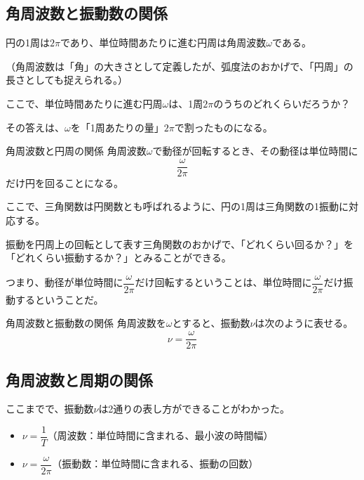 \documentclass[../math-imaging]{subfiles}
\begin{document}
\subsection{角周波数と振動数の関係}

円の1周は$2\pi$であり、単位時間あたりに進む円周は角周波数$\omega$である。

\footnotesize
（角周波数は「角」の大きさとして定義したが、弧度法のおかげで、「円周」の長さとしても捉えられる。）
\normalsize

ここで、単位時間あたりに進む円周$\omega$は、1周$2\pi$のうちのどれくらいだろうか？

その答えは、$\omega$を「1周あたりの量」$2\pi$で割ったものになる。

\begin{theorem}{角周波数と円周の関係}
  \newline
  角周波数$\omega$で動径が回転するとき、その動径は単位時間に
  \LARGE
  \begin{equation}
    \dfrac{\omega}{2\pi}
  \end{equation}
  \normalsize
  だけ円を回ることになる。
\end{theorem}

ここで、三角関数は円関数とも呼ばれるように、円の1周は三角関数の1振動に対応する。

振動を円周上の回転として表す三角関数のおかげで、「どれくらい回るか？」を「どれくらい振動するか？」とみることができる。

つまり、動径が単位時間に$\dfrac{\omega}{2\pi}$だけ回転するということは、単位時間に$\dfrac{\omega}{2\pi}$だけ振動するということだ。

\begin{theorem}{角周波数と振動数の関係}
  \newline
  角周波数を$\omega$とすると、振動数$\nu$は次のように表せる。
  \LARGE
  \begin{equation}
    \nu = \dfrac{\omega}{2\pi}
  \end{equation}
  \normalsize
\end{theorem}

\subsection{角周波数と周期の関係}

ここまでで、振動数$\nu$は2通りの表し方ができることがわかった。

\begin{itemize}
  \item $\nu = \dfrac{1}{T}$（周波数：単位時間に含まれる、最小波の時間幅）
  \item $\nu = \dfrac{\omega}{2\pi}$（振動数：単位時間に含まれる、振動の回数）
\end{itemize}
\end{document}

